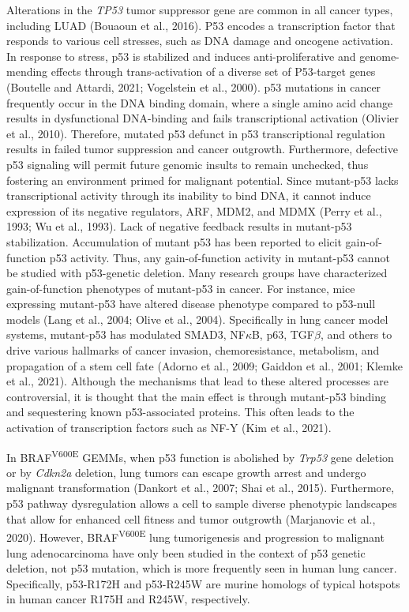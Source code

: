 Alterations in the \emph{TP53} tumor suppressor gene are common in all cancer types, including LUAD (Bouaoun et al., 2016). P53 encodes a transcription factor that responds to various cell stresses, such as DNA damage and oncogene activation. In response to stress, p53 is stabilized and induces anti-proliferative and genome-mending effects through trans-activation of a diverse set of P53-target genes (Boutelle and Attardi, 2021; Vogelstein et al., 2000). p53 mutations in cancer frequently occur in the DNA binding domain, where a single amino acid change results in dysfunctional DNA-binding and fails transcriptional activation (Olivier et al., 2010). Therefore, mutated p53 defunct in p53 transcriptional regulation results in failed tumor suppression and cancer outgrowth. Furthermore, defective p53 signaling will permit future genomic insults to remain unchecked, thus fostering an environment primed for malignant potential. Since mutant-p53 lacks transcriptional activity through its inability to bind DNA, it cannot induce expression of its negative regulators, ARF, MDM2, and MDMX (Perry et al., 1993; Wu et al., 1993). Lack of negative feedback results in mutant-p53 stabilization. Accumulation of mutant p53 has been reported to elicit gain-of-function p53 activity. Thus, any gain-of-function activity in mutant-p53 cannot be studied with p53-genetic deletion. Many research groups have characterized gain-of-function phenotypes of mutant-p53 in cancer. For instance, mice expressing mutant-p53 have altered disease phenotype compared to p53-null models (Lang et al., 2004; Olive et al., 2004). Specifically in lung cancer model systems, mutant-p53 has modulated SMAD3, NF\(\kappa\)B, p63, TGF\(\beta\), and others to drive various hallmarks of cancer invasion, chemoresistance, metabolism, and propagation of a stem cell fate (Adorno et al., 2009; Gaiddon et al., 2001; Klemke et al., 2021). Although the mechanisms that lead to these altered processes are controversial, it is thought that the main effect is through mutant-p53 binding and sequestering known p53-associated proteins. This often leads to the activation of transcription factors such as NF-Y (Kim et al., 2021).

In BRAF\textsuperscript{V600E} GEMMs, when p53 function is abolished by \emph{Trp53} gene deletion or by \emph{Cdkn2a} deletion, lung tumors can escape growth arrest and undergo malignant transformation (Dankort et al., 2007; Shai et al., 2015). Furthermore, p53 pathway dysregulation allows a cell to sample diverse phenotypic landscapes that allow for enhanced cell fitness and tumor outgrowth (Marjanovic et al., 2020). However, BRAF\textsuperscript{V600E} lung tumorigenesis and progression to malignant lung adenocarcinoma have only been studied in the context of p53 genetic deletion, not p53 mutation, which is more frequently seen in human lung cancer. Specifically, p53-R172H and p53-R245W are murine homologs of typical hotspots in human cancer R175H and R245W, respectively.

